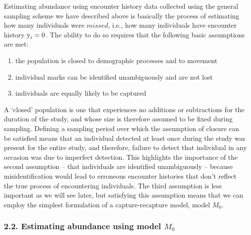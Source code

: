 \documentclass{book}
\begin{document}
Estimating abundance using encounter history data collected using the
general sampling scheme we have described above is basically the
process of estimating how many individuals were $missed$, i.e., how
many individuals have encounter history $\hbox{y}_i = 0$. The ability
to do so requires that the following basic assumptions are met:

\begin{enumerate}
\item the population is closed to demographic processes and to
  movement
\item individual marks can be identified unambiguously and are not lost
\item individuals are equally likely to be captured
\end{enumerate}

A `closed' population is one that experiences no additions or
subtractions for the duration of the study, and whose size is
therefore assumed to be fixed during sampling. Defining a sampling
period over which the assumption of closure can be satisfied means
that an individual detected at least once during the study was present
for the entire study, and therefore, failure to detect that individual
in any occasion was due to imperfect detection. This highlights the
importance of the second assumption -- that individuals are identified
unambiguously -- because misidentification would lead to erroneous
encounter histories that don't reflect the true process of
encountering individuals. The third assumption is less important as we
will see later, but satisfying this assumption means that we can employ
the simplest formulation of a capture-recapture model, model $M_0$.

\subsubsection*{2.2. Estimating abundance using model $M_0$}
\end{document}
